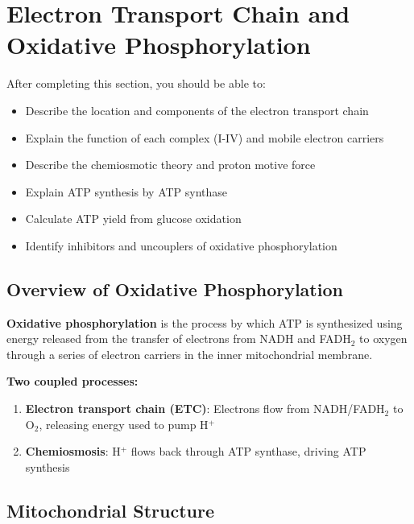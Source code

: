 \section{Electron Transport Chain and Oxidative Phosphorylation}

\begin{objectivebox}
After completing this section, you should be able to:
\begin{itemize}
    \item Describe the location and components of the electron transport chain
    \item Explain the function of each complex (I-IV) and mobile electron carriers
    \item Describe the chemiosmotic theory and proton motive force
    \item Explain ATP synthesis by ATP synthase
    \item Calculate ATP yield from glucose oxidation
    \item Identify inhibitors and uncouplers of oxidative phosphorylation
\end{itemize}
\end{objectivebox}

\subsection{Overview of Oxidative Phosphorylation}

\begin{definition}
\textbf{Oxidative phosphorylation} is the process by which ATP is synthesized using energy released from the transfer of electrons from NADH and FADH$_2$ to oxygen through a series of electron carriers in the inner mitochondrial membrane.
\end{definition}

\textbf{Two coupled processes:}
\begin{enumerate}
    \item \textbf{Electron transport chain (ETC)}: Electrons flow from NADH/FADH$_2$ to O$_2$, releasing energy used to pump H$^+$
    \item \textbf{Chemiosmosis}: H$^+$ flows back through ATP synthase, driving ATP synthesis
\end{enumerate}

\subsection{Mitochondrial Structure}

